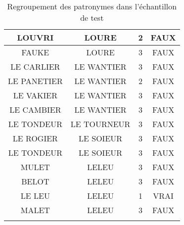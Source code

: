 \begin{center}
\begin{longtable}{|c|c|c|c|}
\hline	LOUVRI	&	LOURE	&	2	&	FAUX	\\
\hline	FAUKE	&	LOURE	&	3	&	FAUX	\\
\hline	LE CARLIER	&	LE WANTIER	&	3	&	FAUX	\\
\hline	LE PANETIER	&	LE WANTIER	&	2	&	FAUX	\\
\hline	LE VAKIER	&	LE WANTIER	&	3	&	FAUX	\\
\hline	LE CAMBIER	&	LE WANTIER	&	3	&	FAUX	\\
\hline	LE TONDEUR	&	LE TOURNEUR	&	3	&	FAUX	\\
\hline	LE ROGIER	&	LE SOIEUR	&	3	&	FAUX	\\
\hline	LE TONDEUR	&	LE SOIEUR	&	3	&	FAUX	\\
\hline	MULET	&	LELEU	&	3	&	FAUX	\\
\hline	BELOT	&	LELEU	&	3	&	FAUX	\\
\hline	LE LEU	&	LELEU	&	1	&	VRAI	\\
\hline	MALET	&	LELEU	&	3	&	FAUX	\\
\hline
\caption{Regroupement des patronymes dans l'échantillon de test}
\label{test_patro}
\end{longtable}
\end{center}
\normalsize